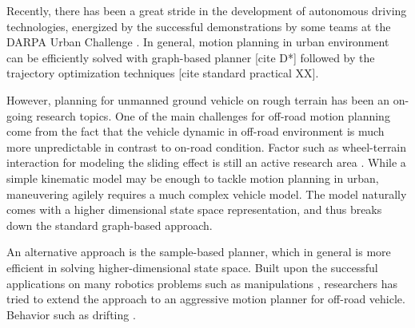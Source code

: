 \documentclass[../thesis.tex]{subfiles}
\begin{document}




Recently, there has been a great stride in the development of autonomous driving technologies, energized by the successful demonstrations by some teams at the DARPA Urban Challenge \cite{boss, multimodaltartan}. In general,
motion planning in urban environment can be efficiently solved with graph-based planner [cite D*] followed by the trajectory optimization techniques [cite standard practical XX]. 

However, planning for unmanned ground vehicle on rough terrain has been an on-going research topics. 
One of the main challenges for off-road motion planning come from the fact that the vehicle dynamic in off-road environment is much more unpredictable in contrast to on-road condition. Factor such as wheel-terrain interaction for modeling the sliding effect is still an active research area . 
While a simple kinematic model may be enough to tackle motion planning in urban, maneuvering agilely requires a much complex vehicle model. The model naturally comes with a higher dimensional state space representation, and thus breaks down the standard graph-based approach. 

An alternative approach is the sample-based planner, which in general is more efficient in solving higher-dimensional state space. 
Built upon the successful applications on many robotics problems such as manipulations \cite{}, researchers has tried to extend the approach to an aggressive motion planner for off-road vehicle. 
Behavior 
such as drifting \cite{}.
\end{document}
